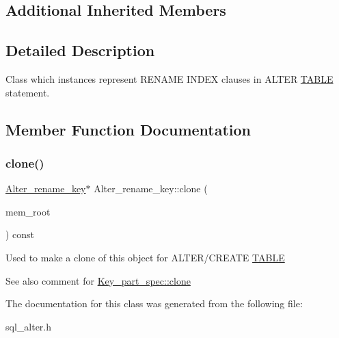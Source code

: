 \subsection*{Additional Inherited Members}


\subsection{Detailed Description}
Class which instances represent R\+E\+N\+A\+ME I\+N\+D\+EX clauses in A\+L\+T\+ER \mbox{\hyperlink{structTABLE}{T\+A\+B\+LE}} statement. 

\subsection{Member Function Documentation}
\mbox{\label{classAlter__rename__key_a146d942023f6e3130ecd4e4362144d4b}} 
\subsubsection{\texorpdfstring{clone()}{clone()}}
{\footnotesize\ttfamily \mbox{\hyperlink{classAlter__rename__key}{Alter\+\_\+rename\+\_\+key}}$\ast$ Alter\+\_\+rename\+\_\+key\+::clone (\begin{DoxyParamCaption}\item[{M\+E\+M\+\_\+\+R\+O\+OT $\ast$}]{mem\+\_\+root }\end{DoxyParamCaption}) const\hspace{0.3cm}{\ttfamily [inline]}}

Used to make a clone of this object for A\+L\+T\+E\+R/\+C\+R\+E\+A\+TE \mbox{\hyperlink{structTABLE}{T\+A\+B\+LE}} \begin{DoxySeeAlso}{See also}
comment for \mbox{\hyperlink{classKey__part__spec_adf40542629144b3dc70f9ae4b4b27c78}{Key\+\_\+part\+\_\+spec\+::clone}} 
\end{DoxySeeAlso}


The documentation for this class was generated from the following file\+:\begin{DoxyCompactItemize}
\item 
sql\+\_\+alter.\+h\end{DoxyCompactItemize}
